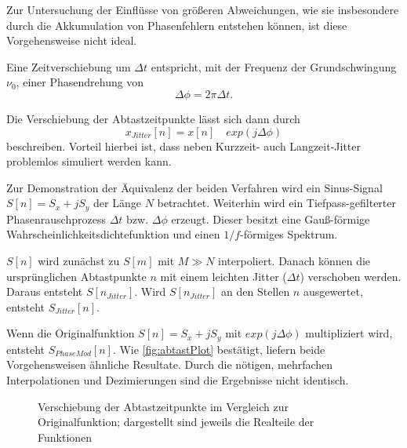 Zur Untersuchung der Einflüsse von größeren Abweichungen, wie sie insbesondere durch die Akkumulation von Phasenfehlern entstehen können, ist diese Vorgehensweise nicht ideal.

Eine Zeitverschiebung um $\Delta t$ entspricht, mit der Frequenz der Grundschwingung $\nu_0$, einer Phasendrehung von
\begin{equation}
	\Delta \phi = 2 \pi \Delta t.
\end{equation}

Die Verschiebung der Abtastzeitpunkte lässt sich dann durch
\begin{equation}
	x_{Jitter}[n] = x[n] \quad exp(j \Delta \phi)
\end{equation}
beschreiben. Vorteil hierbei ist, dass neben Kurzzeit- auch Langzeit-Jitter problemlos simuliert werden kann.

Zur Demonstration der Äquivalenz der beiden Verfahren wird ein Sinus-Signal $S[n]=S_x+j S_y$ der Länge $N$ betrachtet. Weiterhin wird ein Tiefpass-gefilterter Phasenrauschprozess $\Delta t$ bzw. $\Delta \phi$ erzeugt. Dieser besitzt eine Gauß-förmige Wahrscheinlichkeitsdichtefunktion und einen $1/f$-förmiges Spektrum.

$S[n]$ wird zunächst zu $S[m]$ mit $M \gg N$ interpoliert. Danach können die ursprünglichen Abtastpunkte $n$ mit einem leichten Jitter ($\Delta t$) verschoben werden. Daraus entsteht $S[n_{Jitter}]$. Wird $S[n_{Jitter}]$ an den Stellen $n$ ausgewertet, entsteht $S_{Jitter}[n]$.

Wenn die Originalfunktion $S[n]=S_x+j S_y$ mit $exp(j \Delta \phi)$ multipliziert wird, entsteht $S_{PhaseMod}[n]$. Wie \autoref{fig:abtastPlot} bestätigt, liefern beide Vorgehensweisen ähnliche Resultate. Durch die nötigen, mehrfachen Interpolationen und Dezimierungen sind die Ergebnisse nicht identisch. 

\begin{figure}[H]
	\centering
	\caption[Verschiebung Abtastzeitpunkte]{Verschiebung der Abtastzeitpunkte im Vergleich zur Originalfunktion; dargestellt sind jeweils die Realteile der Funktionen}
	\label{fig:abtastPlot}
\end{figure}

